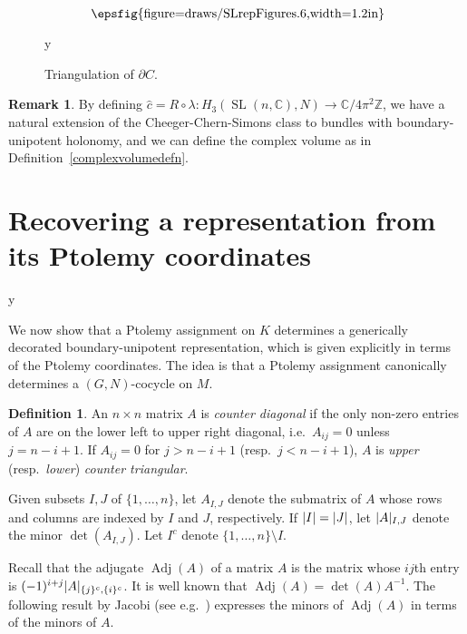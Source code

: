 \documentclass[11pt]{amsart}
\theoremstyle{definition}
\newtheorem{definition}[theorem]{Definition}
\newtheorem{remark}[theorem]{Remark}
\numberwithin{equation}{section}
\def\printname#1{
        \if\draft y
                \smash{\makebox[0pt]{\hspace{-0.5in}
                        \raisebox{8pt}{\tt\tiny #1}}}
        \fi
}
\newcommand{\psdraw}[2]
         {\begin{array}{c} \hspace{-1.3mm}
        \raisebox{-4pt}{\epsfig{figure=draws/#1,width=#2}}
        \hspace{-1.9mm}\end{array}}
\def\lbl#1{\label{#1}\printname{#1}}
\DeclareMathOperator{\SL}{SL}
\DeclareMathOperator{\Adj}{Adj}
\DeclarePairedDelimiter{\Norm}{\lvert}{\rvert}
\newcommand{\C}{\mathbb C}
\newcommand{\Z}{\mathbb Z}
\begin{document}
\begin{figure}[htpb]
$$
\psdraw{SLrepFigures.6}{1.2in}
$$
\caption{Triangulation of $\partial C$.}\lbl{cubefigure}
\end{figure}

\begin{remark}\label{extensionremark}By defining $\widehat c=R\circ\lambda\colon H_3(\SL(n,\C),N)\to\C/4\pi^2\Z$, we have a natural extension of the 
Cheeger-Chern-Simons class to bundles with boundary-unipotent holonomy, and we can define the complex volume as in Definition~\ref{complexvolumedefn}.
\end{remark}


\section{Recovering a representation from its Ptolemy coordinates}
\lbl{proofsection}

We now show that a Ptolemy assignment on $K$ determines a
generically decorated
boundary-unipotent representation, which is given explicitly in terms of the Ptolemy coordinates. 
The idea is that a Ptolemy assignment 
canonically determines a $(G,N)$-cocycle on $M$. %

\begin{definition} 
An $n\times n$ matrix $A$ is \emph{counter diagonal} if the only non-zero 
entries of $A$ are on the lower left to upper right diagonal, i.e.~$A_{ij}=0$ 
unless $j=n-i+1$. If $A_{ij}=0$ for $j>n-i+1$ (resp.~$j<n-i+1$), $A$ is 
\emph{upper} (resp.~\emph{lower}) \emph{counter triangular}.
\end{definition}

Given subsets $I,J$ of $\{1,\dots,n\}$, let $A_{I,J}$ denote the submatrix 
of $A$ whose rows and columns are indexed by $I$ and $J$, respectively. If 
$\Norm{I}=\Norm{J}$, let $\Norm A_{I,J}$ denote the minor $\det(A_{I,J})$.
Let $I^c$ denote $\{1,\dots,n\}\setminus I$. 


Recall that the adjugate $\Adj(A)$ of a matrix $A$ is the matrix whose 
$ij$th entry is $(-1)^{i+j}\Norm{A}_{\{j\}^c,\{i\}^c}$. It is well known that 
$\Adj(A)=\det(A)A^{-1}$. The following result by Jacobi 
(see e.g.~\cite[Section~42]{DeterminantBook}) expresses the minors of 
$\Adj(A)$ in terms of the minors of $A$.
\end{document}
